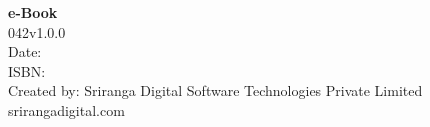 \thispagestyle{empty}

 \textbf{e-Book}\\
 042v1.0.0\\
 Date: \\
 ISBN: \\
 Created by: Sriranga Digital Software Technologies Private Limited\\srirangadigital.com

